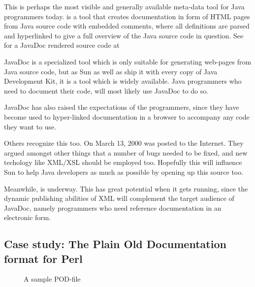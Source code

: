 This is perhaps the most visible and generally available meta-data
tool for Java programmers today.
is a tool that creates documentation in form of HTML pages from Java
source code with embedded comments, where all definitions are parsed
and hyperlinked to give a full overview of the Java source code in
question.  See  for a JavaDoc rendered source
code at 

JavaDoc is a specialized tool which is only suitable for generating
web-pages from Java source code, but as Sun
 as well as ship it with
every copy of Java Development Kit, it is a tool which is widely
available.  Java programmers who need to document their code, will most
likely use JavaDoc to do so.

JavaDoc has also raised the expectations of the programmers, since
they have become used to hyper-linked documentation in a browser to
accompany any code they want to use.  

Others recognize this too.  On March 13, 2000
 was posted to the Internet.  They argued
amongst other things that a number of bugs needed to be
fixed, and new techology like XML/XSL should be employed
too.  Hopefully this will influence Sun to help Java
developers as much as possible by opening up this source
too.

Meanwhile,  is underway.
This has great potential when it gets running, since the dynamic
publishing abilities of XML will complement the target audience of
  JavaDoc, namely programmers who need reference documentation in an
  electronic form.

\subsection{Case study: The Plain Old Documentation format for Perl}
\label{sec:perlpod}

\begin{figure}[htbp]
  \begin{center}
%
\caption{A sample POD-file}
    \label{fig:sample-pod-file}
  \end{center}
\end{figure}

